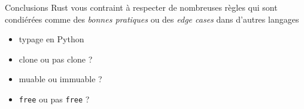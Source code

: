 \documentclass[usenames,dvipsnames]{beamer}
\begin{document}
\begin{frame}{Conclusions}
	Rust vous contraint à respecter de nombreuses règles qui sont condiérées comme des \textit{bonnes pratiques} ou des \textit{edge cases} dans d'autres langages
	\begin{itemize}
		\item typage en Python
		\item clone ou pas clone ?
		\item muable ou immuable ?
		\item \texttt{free} ou pas \texttt{free} ? 
	\end{itemize}
\end{frame}
\end{document}
